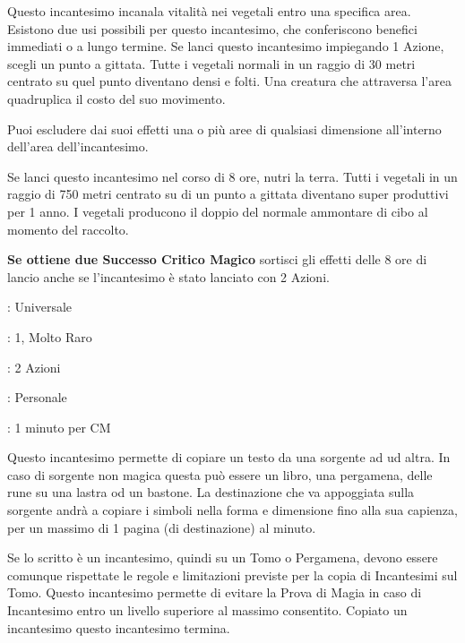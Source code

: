 \begin{multicols}{2}
Questo incantesimo incanala vitalità nei vegetali entro una specifica area. Esistono due usi possibili per questo incantesimo, che conferiscono benefici immediati o a lungo termine. Se lanci questo incantesimo impiegando 1 Azione, scegli un punto a gittata. Tutte i vegetali normali in un raggio di 30 metri centrato su quel punto diventano densi e folti. Una creatura che attraversa l'area quadruplica il costo del suo movimento.

Puoi escludere dai suoi effetti una o più aree di qualsiasi dimensione all'interno dell'area dell'incantesimo.

Se lanci questo incantesimo nel corso di 8 ore, nutri la terra. Tutti i vegetali in un raggio di 750 metri centrato su di un punto a gittata diventano super produttivi per 1 anno. I vegetali producono il doppio del normale ammontare di cibo al momento del raccolto.

\textbf{Se ottiene due Successo Critico Magico} sortisci gli effetti delle 8 ore di lancio anche se l'incantesimo è stato lanciato con 2 Azioni.

\noindent\colorbox{OBSSgold!10}{
\begin{minipage}{0.95\linewidth}
\begin{description}[noitemsep, topsep=0pt, parsep=0pt, partopsep=0pt, leftmargin=0cm, labelwidth=1.3cm]
	\item[\textbf{Lista}]: Universale
	\item[\textbf{Livello}]: 1, Molto Raro
	\item[\textbf{Lancio}]: 2 Azioni
	\item[\textbf{Gittata}]: Personale
	\item[\textbf{Durata}]: 1 minuto per CM
\end{description}
\end{minipage}}\smallskip

Questo incantesimo permette di copiare un testo da una sorgente ad ud altra. In caso di sorgente non magica questa può essere un libro, una pergamena, delle rune su una lastra od un bastone. La destinazione che va appoggiata sulla sorgente andrà a copiare i simboli nella forma e dimensione fino alla sua capienza, per un massimo di 1 pagina (di destinazione) al minuto.

Se lo scritto è un incantesimo, quindi su un Tomo o Pergamena, devono essere comunque rispettate le regole e limitazioni previste per la copia di Incantesimi sul Tomo. Questo incantesimo permette di evitare la Prova di Magia in caso di Incantesimo entro un livello superiore al massimo consentito. Copiato un incantesimo questo incantesimo termina.


\end{multicols}
